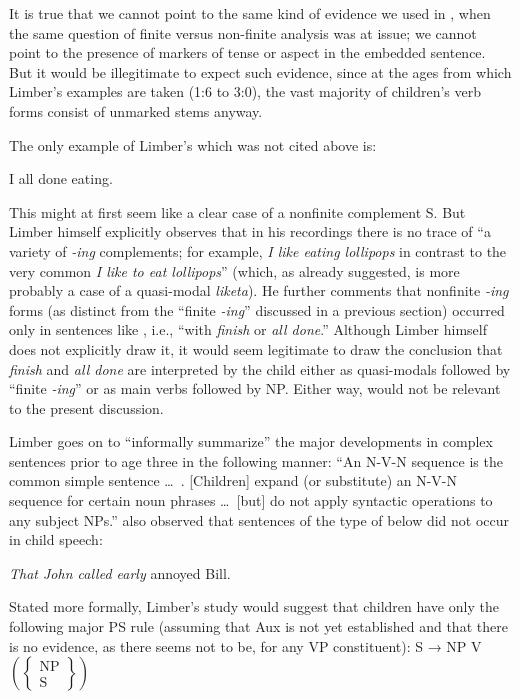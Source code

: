 It is true that we cannot point to the same kind of evidence
we used in , when the same question of finite versus non-finite analysis was at issue; we cannot point to the presence of markers of tense or aspect in the embedded sentence. But it would be illegitimate to expect such evidence, since at the ages from which Limber's examples are taken (1:6 to 3:0), the vast majority of children's verb forms consist of unmarked stems anyway.

The only example of Limber's which was not cited above is:

\ea\label{ex:3:37}
 I all done eating.
\z

\noindent This might at first seem like a clear case of a nonfinite complement S. But Limber himself explicitly observes that in his recordings there is no trace of ``a variety of \textit{-ing} complements; for example, \textit{I like eating lollipops} in contrast to the very common \textit{I like to eat lollipops}'' (which, as already suggested, is more probably a case of a quasi-modal \textit{liketa}). He further comments that nonfinite \textit{-ing} forms (as distinct from the ``finite \textit{-ing}'' discussed in a previous section) occurred only in sentences like , i.e., ``with \textit{finish} or \textit{all done}.'' Although Limber himself does not explicitly draw it, it would seem legitimate to draw the conclusion that \textit{finish} and \textit{all done} are interpreted by the child either as quasi-modals followed by ``finite \textit{-ing}'' or as main verbs followed by NP. Either way,  would not be relevant to the present discussion.

Limber goes on to ``informally summarize'' the major developments in complex sentences prior to age three in the following manner: ``An N-V-N sequence is the common simple sentence \ldots~. [Children] expand (or substitute) an N-V-N sequence for certain noun phrases \ldots~[but] do not apply syntactic operations to any subject NPs.'' \citet[21]{Brown1973} also observed that sentences of the type of  below did not occur in child speech:

\ea\label{ex:3:38}
 \textit{That John called early} annoyed Bill.
\z

\noindent Stated more formally, Limber's study would suggest that children have only the following major PS rule (assuming that Aux is not yet 
established and that there is no evidence, as there seems not to be, for any VP constituent):
\ea\label{ex:3:39}
S → NP V $\left(\left\{\begin{array}{c}\text{NP}\\\text{S}\end{array}\right\}\right)$
\z

